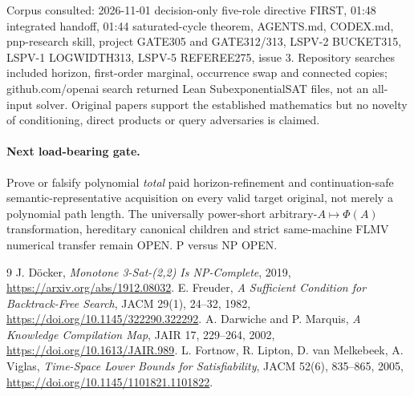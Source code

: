\documentclass[11pt]{article}
\begin{document}
Corpus consulted: 2026-11-01 decision-only five-role directive FIRST, 01:48 integrated handoff, 01:44 saturated-cycle theorem, AGENTS.md, CODEX.md, pnp-research skill, project GATE305 and GATE312/313, LSPV-2 BUCKET315, LSPV-1 LOGWIDTH313, LSPV-5 REFEREE275, issue 3. Repository searches included horizon, first-order marginal, occurrence swap and connected copies; github.com/openai search returned Lean SubexponentialSAT files, not an all-input solver. Original papers support the established mathematics but no novelty of conditioning, direct products or query adversaries is claimed.

\paragraph{Next load-bearing gate.} Prove or falsify polynomial \emph{total} paid horizon-refinement and continuation-safe semantic-representative acquisition on every valid target original, not merely a polynomial path length. The universally power-short arbitrary-$A\mapsto\Phi(A)$ transformation, hereditary canonical children and strict same-machine FLMV numerical transfer remain OPEN. P versus NP OPEN.

\begin{thebibliography}{9}
 J. D\"ocker, \emph{Monotone 3-Sat-(2,2) Is NP-Complete}, 2019, \url{https://arxiv.org/abs/1912.08032}.
 E. Freuder, \emph{A Sufficient Condition for Backtrack-Free Search}, JACM 29(1), 24--32, 1982, \url{https://doi.org/10.1145/322290.322292}.
 A. Darwiche and P. Marquis, \emph{A Knowledge Compilation Map}, JAIR 17, 229--264, 2002, \url{https://doi.org/10.1613/JAIR.989}.
 L. Fortnow, R. Lipton, D. van Melkebeek, A. Viglas, \emph{Time-Space Lower Bounds for Satisfiability}, JACM 52(6), 835--865, 2005, \url{https://doi.org/10.1145/1101821.1101822}.
\end{thebibliography}
\end{document}

